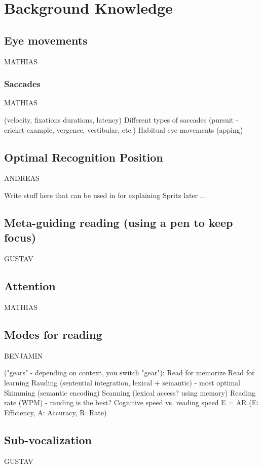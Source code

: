 \section{Background Knowledge}

\subsection{Eye movements}
MATHIAS

\subsubsection{Saccades}
MATHIAS

(velocity, fixations durations, latency)
Different types of saccades (pursuit - cricket example, vergence, vestibular, etc.)
Habitual eye movements (apping)
\subsection{Optimal Recognition Position} \label{ORP}
ANDREAS

Write stuff here that can be used in for explaining Spritz later ...


\subsection{Meta-guiding reading (using a pen to keep focus)}
GUSTAV

\subsection{Attention}
MATHIAS

\subsection{Modes for reading}
BENJAMIN

("gears" - depending on context, you switch "gear"):
Read for memorize
Read for learning
Rauding (sentential integration, lexical + semantic) - most optimal
Skimming (semantic encoding)
Scanning (lexical access? using memory)
Reading rate (WPM) - rauding is the best?
Cognitive speed vs. reading speed
E = AR (E: Efficiency, A: Accuracy, R: Rate)

\subsection{Sub-vocalization}
GUSTAV
